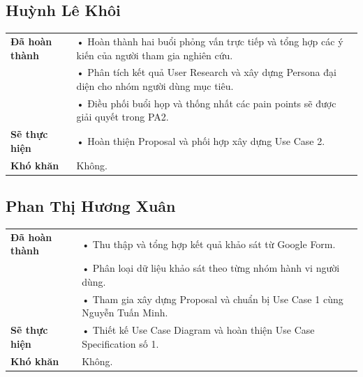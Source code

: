 \documentclass[11pt,a4paper]{article}
\begin{document}
\vspace{0.6cm}


\subsection*{Huỳnh Lê Khôi}

\begin{tabularx}{\textwidth}{|p{4cm}|X|}
\hline
\textbf{Đã hoàn thành} &
• Hoàn thành hai buổi phỏng vấn trực tiếp và tổng hợp các ý kiến của người tham gia nghiên cứu.\\
&
• Phân tích kết quả User Research và xây dựng Persona đại diện cho nhóm người dùng mục tiêu.\\
&
• Điều phối buổi họp và thống nhất các pain points sẽ được giải quyết trong PA2.\\
\hline

\textbf{Sẽ thực hiện} &
• Hoàn thiện Proposal và phối hợp xây dựng Use Case 2.\\
\hline

\textbf{Khó khăn} &
Không.\\
\hline
\end{tabularx}

\vspace{0.6cm}


\subsection*{Phan Thị Hương Xuân}

\begin{tabularx}{\textwidth}{|p{4cm}|X|}
\hline
\textbf{Đã hoàn thành} &
• Thu thập và tổng hợp kết quả khảo sát từ Google Form.\\
&
• Phân loại dữ liệu khảo sát theo từng nhóm hành vi người dùng.\\
&
• Tham gia xây dựng Proposal và chuẩn bị Use Case 1 cùng Nguyễn Tuấn Minh.\\
\hline

\textbf{Sẽ thực hiện} &
• Thiết kế Use Case Diagram và hoàn thiện Use Case Specification số 1.\\
\hline

\textbf{Khó khăn} &
Không.\\
\hline
\end{tabularx}
\end{document}
